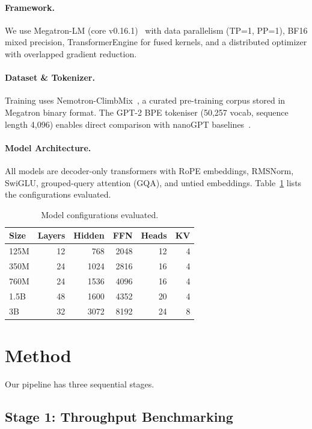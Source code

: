 \documentclass[10pt,twocolumn]{article}
\begin{document}
\paragraph{Framework.}
We use Megatron-LM (core v0.16.1)~\cite{megatron} with data parallelism
(TP=1, PP=1), BF16 mixed precision, TransformerEngine for fused kernels, and
a distributed optimizer with overlapped gradient reduction.

\paragraph{Dataset \& Tokenizer.}
Training uses Nemotron-ClimbMix~\cite{climbmix}, a curated pre-training
corpus stored in Megatron binary format. The GPT-2 BPE tokeniser (50,257
vocab, sequence length 4,096) enables direct comparison with nanoGPT
baselines~\cite{nanogpt}.

\paragraph{Model Architecture.}
All models are decoder-only transformers with RoPE embeddings, RMSNorm,
SwiGLU, grouped-query attention (GQA), and untied embeddings.
Table~\ref{tab:model-configs} lists the configurations evaluated.

\begin{table}[H]
\centering
\small
\begin{tabular}{lrrrrr}
\toprule
Size & Layers & Hidden & FFN  & Heads & KV \\
\midrule
125M & 12 & 768  & 2048  & 12 & 4 \\
350M & 24 & 1024 & 2816  & 16 & 4 \\
760M & 24 & 1536 & 4096  & 16 & 4 \\
1.5B & 48 & 1600 & 4352  & 20 & 4 \\
3B   & 32 & 3072 & 8192  & 24 & 8 \\
\bottomrule
\end{tabular}
\caption{Model configurations evaluated.}
\label{tab:model-configs}
\end{table}

\section{Method}

Our pipeline has three sequential stages.

\subsection{Stage 1: Throughput Benchmarking}
\end{document}
